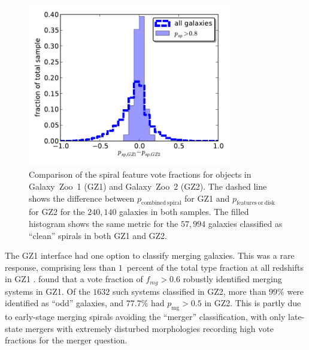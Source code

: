 \documentclass[useAMS,usenatbib]{mn2e}
\begin{document}
\begin{figure}
\includegraphics[angle=0,width=3.5in]{figures/gz1_gz2.pdf}
\caption{Comparison of the spiral feature vote fractions for objects in Galaxy~Zoo~1 (GZ1) and Galaxy~Zoo~2 (GZ2). The dashed line shows the difference between $p_\mathrm{combined~spiral}$ for GZ1 and $p_\mathrm{features~or~disk}$ for GZ2 for the $240,140$ galaxies in both samples. The filled histogram shows the same metric for the $57,994$ galaxies classified as ``clean'' spirals in both GZ1 and GZ2. 
\label{fig-gz1_gz2}}
\end{figure}

The GZ1 interface had one option to classify merging galaxies. This was a rare response, comprising less than $1$~percent of the total type fraction at all redshifts in GZ1 \citep{bam09}. \citet{dar10a} found that a vote fraction of $f_{mg} > 0.6$ robustly identified merging systems in GZ1. Of the $1632$ such systems classified in GZ2, more than $99\%$ were identified as ``odd'' galaxies, and $77.7\%$ had $p_\mathrm{mg}>0.5$ in GZ2. This is partly due to early-stage merging spirals avoiding the ``merger'' classification, with only late-state mergers with extremely disturbed morphologies recording high vote fractions for the merger question. 
\end{document}
